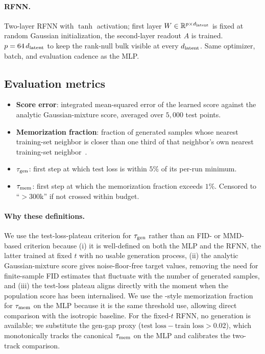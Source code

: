 \paragraph{RFNN.} Two-layer RFNN with $\tanh$ activation; first layer
$W \in \mathbb{R}^{p \times d_{\mathrm{latent}}}$ is fixed at random Gaussian
initialization, the second-layer readout $A$ is trained. $p = 64\,d_{\mathrm{latent}}$
to keep the rank-null bulk visible at every $d_{\mathrm{latent}}$. Same optimizer, batch,
and evaluation cadence as the MLP.

\subsection{Evaluation metrics}
\begin{itemize}\itemsep1pt
\item \textbf{Score error}: integrated mean-squared error of the learned
      score against the analytic Gaussian-mixture score, averaged over
      $5{,}000$ test points.
\item \textbf{Memorization fraction}: fraction of generated samples whose
      nearest training-set neighbor is closer than one third of that
      neighbor's own nearest training-set
      neighbor~\citep{somepalli2023diffusion}.
\item \textbf{$\tau_{\mathrm{gen}}$}: first step at which test loss is within $5\%$ of
      its per-run minimum.
\item \textbf{$\tau_{\mathrm{mem}}$}: first step at which the memorization fraction
      exceeds $1\%$. Censored to ``$>$300k'' if not crossed within budget.
\end{itemize}

\paragraph{Why these definitions.}
We use the test-loss-plateau criterion for $\tau_{\mathrm{gen}}$ rather than an FID-
or MMD-based criterion because (i) it is well-defined on both the MLP
and the RFNN, the latter trained at fixed $t$ with no usable generation
process, (ii) the analytic Gaussian-mixture score gives noise-floor-free
target values, removing the need for finite-sample FID estimates that
fluctuate with the number of generated samples, and (iii) the test-loss
plateau aligns directly with the moment when the population score has
been internalised. We use the \citet{somepalli2023diffusion}-style
memorization fraction for $\tau_{\mathrm{mem}}$ on the MLP because it is the same
threshold \citet{bonnaire2025} use, allowing direct comparison with the
isotropic baseline. For the fixed-$t$ RFNN, no generation is available;
we substitute the gen-gap proxy ($\text{test loss} - \text{train loss}
> 0.02$), which monotonically tracks the canonical $\tau_{\mathrm{mem}}$ on the MLP
and calibrates the two-track comparison.

